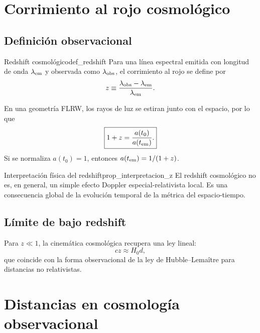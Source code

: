 \section{Corrimiento al rojo cosmológico}
\label{sec:redshift_cosmologico}

\subsection{Definición observacional}

\begin{definicion}{Redshift cosmológico}{def_redshift}
Para una línea espectral emitida con longitud de onda $\lambda_{\rm em}$ y observada como $\lambda_{\rm obs}$, el corrimiento al rojo se define por
\begin{equation}
  z \equiv \frac{\lambda_{\rm obs}-\lambda_{\rm em}}{\lambda_{\rm em}}.
\end{equation}
\end{definicion}

En una geometría FLRW, los rayos de luz se estiran junto con el espacio, por lo que
\begin{equation}
  \boxed{1+z = \frac{a(t_0)}{a(t_{\rm em})}.}
  \label{eq:redshift_scalefactor}
\end{equation}
Si se normaliza $a(t_0)=1$, entonces $a(t_{\rm em})=1/(1+z)$.

\begin{proposicion}{Interpretación física del redshift}{prop_interpretacion_z}
El redshift cosmológico no es, en general, un simple efecto Doppler especial-relativista local. Es una consecuencia global de la evolución temporal de la métrica del espacio-tiempo.
\end{proposicion}

\subsection{Límite de bajo redshift}

Para $z\ll1$, la cinemática cosmológica recupera una ley lineal:
\begin{equation}
  cz \approx H_0 d,
\end{equation}
que coincide con la forma observacional de la ley de Hubble--Lemaître para distancias no relativistas.

\section{Distancias en cosmología observacional}
\label{sec:distancias_cosmologicas}

